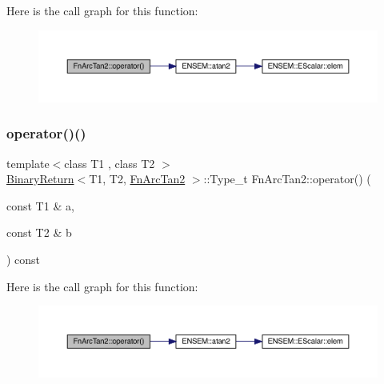 Here is the call graph for this function\+:
\nopagebreak
\begin{figure}[H]
\begin{center}
\leavevmode
\includegraphics[width=350pt]{d0/d07/structFnArcTan2_a919de5b0c020758f5280cc89b30e6133_cgraph}
\end{center}
\end{figure}
\mbox{\label{structFnArcTan2_a919de5b0c020758f5280cc89b30e6133}} 
\subsubsection{\texorpdfstring{operator()()}{operator()()}\hspace{0.1cm}{\footnotesize\ttfamily [2/3]}}
{\footnotesize\ttfamily template$<$class T1 , class T2 $>$ \\
\mbox{\hyperlink{structBinaryReturn}{Binary\+Return}}$<$T1, T2, \mbox{\hyperlink{structFnArcTan2}{Fn\+Arc\+Tan2}} $>$\+::Type\+\_\+t Fn\+Arc\+Tan2\+::operator() (\begin{DoxyParamCaption}\item[{const T1 \&}]{a,  }\item[{const T2 \&}]{b }\end{DoxyParamCaption}) const\hspace{0.3cm}{\ttfamily [inline]}}

Here is the call graph for this function\+:
\nopagebreak
\begin{figure}[H]
\begin{center}
\leavevmode
\includegraphics[width=350pt]{d0/d07/structFnArcTan2_a919de5b0c020758f5280cc89b30e6133_cgraph}
\end{center}
\end{figure}
\mbox{\label{structFnArcTan2_a919de5b0c020758f5280cc89b30e6133}} 
